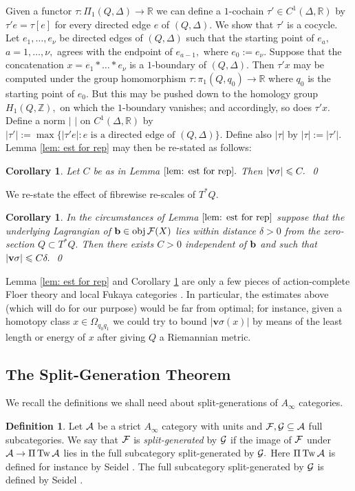 \documentclass{article}
\DeclareMathOperator{\Tw}{Tw}
\theoremstyle{plain}%
\newtheorem{cor}[thm]{Corollary}
\theoremstyle{definition}
\newtheorem{dfn}[thm]{Definition}
\numberwithin{equation}{section}
\numberwithin{figure}{section}
\def\l{\label}
\def\le{\leqslant\nobreak}
\def\cA{{\mathbin{\cal A}}}
\def\cF{{\mathbin{\cal F}}}
\def\cG{{\mathbin{\cal G}}}
\def\R{{\mathbin{\mathbb R}}}
\def\Z{{\mathbin{\mathbb Z}}}
\def\de{\delta}
\def\si{\sigma}
\def\ta{\tau}
\def\De{\Delta}
\def\Om{\Omega}
\def\iy{\infty}
\def\sb{\subseteq}
\def\v{{\mathbf{v}}}\def\cl{{\rm cl}}\def\alg{{\rm alg}}\def\geom{{\rm geom}}\def\loc{{\rm loc}}\def\dirlim{\displaystyle\varinjlim}
\begin{document}
Given a functor $\ta:\Pi_1(Q,\De)\to \R$ we can define a $1$-cochain $\ta'\in C^1(\De,\R)$ by $\ta' e=\ta[e]$ for every directed edge $e$ of $(Q,\De).$ We show that $\ta'$ is a cocycle. Let $e_1,\dots,e_\nu$ be directed edges of $(Q,\De)$ such that the starting point of $e_a,$ $a=1,\dots,\nu,$ agrees with the endpoint of $e_{a-1},$ where $e_0:=e_\nu.$ Suppose that the concatenation $x=e_1*\dots* e_\nu$ is a $1$-boundary of $(Q,\De).$ Then $\ta' x$ may be computed under the group homomorphism $\ta:\pi_1(Q,q_0)\to\R$ where $q_0$ is the starting point of $e_0.$  But this may be pushed down to the homology group $H_1(Q,\Z),$ on which the $1$-boundary vanishes; and accordingly, so does $\ta'x.$ Define a norm $|\,\,|$ on $C^1(\De,\R)$ by $|\ta'|:=\max\{|\ta' e|: e\text{ is a directed edge of }(Q,\De)\}.$ Define also $|\ta|$ by $|\ta|:=|\ta'|.$
Lemma \ref{lem: est for rep} may then be re-stated as follows: 
\begin{cor}\l{cor: est for norm}
Let $C$ be as in Lemma $\ref{lem: est for rep}.$ Then $|\v\si|\le C.$ \qed
\end{cor}

We re-state the effect of fibrewise re-scales of $T^*Q.$
\begin{cor}\l{cor: est for rep}
In the circumstances of Lemma $\ref{lem: est for rep}$ suppose that the underlying Lagrangian of $\b\in\obj\cF(X)$ lies within distance $\de>0$ from the zero-section $Q\subset T^*Q.$
Then there exists $C>0$ independent of ${\mathbf{b}}$ and such that $|\v\si|\le   C\de.$ \qed
\end{cor}

Lemma \ref{lem: est for rep} and Corollary \ref{cor: est for rep} are only a few pieces of action-complete Floer theory \cite{Seid2012,Varolgunes,Venkatesh} and local Fukaya categories \cite{AGV}. In particular, the estimates above (which will do for our purpose) would be far from optimal; for instance, given a homotopy class $x\in \Om_{q_0q_1}$ we could try to bound $|\v\si(x)|$ by means of the least length or energy of $x$ after giving $Q$ a Riemannian metric.

\subsection{The Split-Generation Theorem}\label{sec:gener-fukaya-categ}
We recall the definitions we shall need about split-generations of $A_\iy$ categories. 
\begin{dfn}
Let $\cA$ be a strict $A_\iy$ category with units and $\cF,\cG\sb\cA$ full subcategories.
We say that $\cF$ is {\it split-generated} by $\cG$ if the image of $\cF$ under $\cA\to \Pi\Tw\cA$ lies in the full subcategory split-generated by $\cG.$ Here $\Pi\Tw\cA$ is defined for instance by Seidel \cite[Lemma 4.7]{Seid3}. The full subcategory split-generated by $\cG$ is defined by Seidel \cite[after Lemma 4.8]{Seid3}.
\end{dfn}
\end{document}
